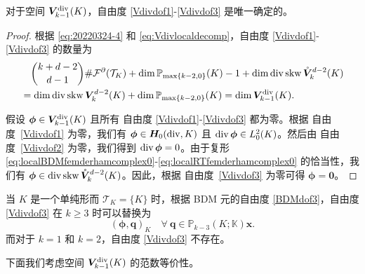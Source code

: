 \begin{lemma}
对于空间 $\boldsymbol{V}_{k-1}^{\rm div}(K)$，自由度 \eqref{Vdivdof1}-\eqref{Vdivdof3} 是唯一确定的。
\end{lemma}
\begin{proof}
根据 \eqref{eq:20220324-4} 和 \eqref{eq:Vdivlocaldecomp}，自由度 \eqref{Vdivdof1}-\eqref{Vdivdof3} 的数量为
\begin{align*}
&\quad {k+d-2\choose d-1}\#\mathcal F^{\partial}(\mathcal T_K)+\operatorname{dim}\mathbb P_{\max\{k-2,0\}}(K)-1+\operatorname{dim}\operatorname{div}\operatorname{skw}\mathring{\boldsymbol{V}}_{k}^{d-2}(K) \\
&=\operatorname{dim}\operatorname{div}\operatorname{skw}\boldsymbol{V}_{k}^{d-2}(K)+\operatorname{dim}\mathbb P_{\max\{k-2,0\}}(K)=\operatorname{dim}\boldsymbol{V}_{k-1}^{\rm div}(K).
\end{align*}

假设 $\boldsymbol{\phi}\in\boldsymbol{V}_{k-1}^{\rm div}(K)$ 且所有 自由度
\eqref{Vdivdof1}-\eqref{Vdivdof3} 都为零。根据 自由度~\eqref{Vdivdof1} 为零，我们有
$\boldsymbol{\phi}\in \boldsymbol{H}_0(\operatorname{div}, K)$ 且
$\operatorname{div}\boldsymbol{\phi}\in L_0^2(K)$。然后由
自由度~\eqref{Vdivdof2} 为零，我们得到 $\operatorname{div}\boldsymbol{\phi}=0$。由于复形
\eqref{eq:localBDMfemderhamcomplex0}-\eqref{eq:localRTfemderhamcomplex0}
的恰当性，我们有
$\boldsymbol{\phi}\in\operatorname{div}\operatorname{skw}\mathring{\boldsymbol{V}}_{k}^{d-2}(K)$。因此，根据
自由度~\eqref{Vdivdof3} 为零可得 $\boldsymbol{\phi}=\boldsymbol{0}$。
\end{proof}

\begin{remark}\rm
当 $K$ 是一个单纯形而 $\mathcal T_K=\{K\}$ 时，根据 BDM 元的自由度 
\eqref{BDMdof3}，自由度 \eqref{Vdivdof3} 在 $k\geq 3$ 时可以替换为
\[
(\boldsymbol{\phi}, \boldsymbol{q})_K \quad\forall~\boldsymbol{q}\in \mathbb
P_{k-3}(K;\mathbb K)\boldsymbol{x}.
\]
而对于 $k=1$ 和 $k=2$，自由度 \eqref{Vdivdof3} 不存在。
\end{remark}

下面我们考虑空间 $\boldsymbol{V}_{k-1}^{\rm div}(K)$ 的范数等价性。

